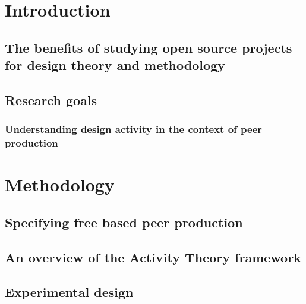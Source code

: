 \documentclass{ICED-Paper}%
\begin{document}



\section{Introduction}
\iffalse
    here we have to define what is the current state of understanding this phenomenon in the context of design studies and research,

    Open Source is an example of peer production in the sense that there is distributed and not centrally controled, peer to peer basis

\fi



\subsection{The benefits of studying open source projects for design theory and methodology}

\subsection{Research goals}

\subsubsection{Understanding design activity in the context of peer production}

\section{Methodology}

\subsection{Specifying free based peer production}

\subsection{An overview of  the Activity Theory framework}

\subsection{Experimental design}
\iffalse
    here I explain the case selected, the rationale behind this selection, as well as the materials used, but also specific questions to answer the general questions,
\fi
\end{document}
